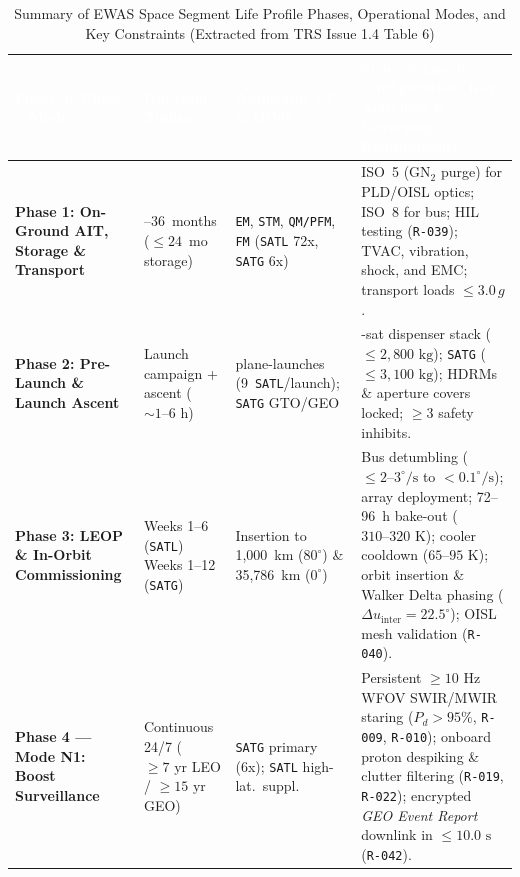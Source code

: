 \documentclass[11pt,a4paper]{article}
\newcommand{\thead}[1]{\textcolor{white}{\textbf{\textsf{#1}}}}
\providecommand{\abbr}[1]{#1}
\begin{document}
\begin{table}[H]
\centering
\caption{Summary of EWAS Space Segment Life Profile Phases, Operational Modes, and Key Constraints (Extracted from TRS Issue 1.4 Table 6)}
\label{tab:sseg_life_profile_archived}
{\scriptsize\setlength{\tabcolsep}{4pt}\renewcommand{\arraystretch}{1.04}%
%
%
\noindent
\begin{tabularx}{\textwidth}{|>{\raggedright\arraybackslash}p{2.5cm}|>{\raggedright\arraybackslash}p{2.0cm}|>{\raggedright\arraybackslash}p{2.7cm}|>{\raggedright\arraybackslash}X|}
    \hline
    \rowcolor{TableHeaderBlue}
    \thead{Lifecycle Phase / Mode} & \thead{Duration / Timing} & \thead{Applicable CI \& Orbit} & \thead{Space Segment Configuration, Key Activities \& Governing Requirements} \\ \hline
    \textbf{Phase 1: On-Ground \abbr{AIT}, Storage \& Transport} & 18--36~months ($\le 24$~mo storage) & \texttt{EM}, \texttt{STM}, \texttt{QM/PFM}, \texttt{FM} (\texttt{SATL} 72x, \texttt{SATG} 6x) & ISO~5 ($\mathrm{GN_2}$ purge) for \abbr{PLD}/\abbr{OISL} optics; ISO~8 for bus; \abbr{HIL} testing (\texttt{R-039}); \abbr{TVAC}, vibration, shock, and EMC; transport loads $\le 3.0\,g$. \\ \hline
    \textbf{Phase 2: Pre-Launch \& Launch Ascent} & Launch campaign + ascent ($\sim 1\text{--}6\text{ h}$) & 8 plane-launches (9~\texttt{SATL}/launch); \texttt{SATG} \abbr{GTO}/\abbr{GEO} & 9-sat dispenser stack ($\le 2{,}800\text{ kg}$); \texttt{SATG} ($\le 3{,}100\text{ kg}$); \abbr{HDRM}s \& aperture covers locked; $\ge 3$ safety inhibits. \\ \hline
    \textbf{Phase 3: \abbr{LEOP} \& In-Orbit Commissioning} & Weeks 1--6 (\texttt{SATL}) \newline Weeks 1--12 (\texttt{SATG}) & Insertion to 1,000~km ($80^\circ$) \& 35,786~km ($0^\circ$) & Bus detumbling ($\le 2\text{--}3^\circ/\text{s}$ to $< 0.1^\circ/\text{s}$); array deployment; 72--96~h bake-out ($310\text{--}320\text{ K}$); cooler cooldown ($65\text{--}95\text{ K}$); orbit insertion \& Walker Delta phasing ($\Delta u_{\text{inter}} = 22.5^\circ$); \abbr{OISL} mesh validation (\texttt{R-040}). \\ \hline
    \textbf{Phase 4 --- Mode N1: Boost Surveillance} & Continuous 24/7 ($\ge 7\text{ yr}$ \abbr{LEO} / $\ge 15\text{ yr}$ \abbr{GEO}) & \texttt{SATG} primary (6x); \texttt{SATL} high-lat.\ suppl. & Persistent $\ge 10\text{ Hz}$ \abbr{WFOV} \abbr{SWIR}/\abbr{MWIR} staring ($P_d > 95\%$, \texttt{R-009}, \texttt{R-010}); onboard proton despiking \& clutter filtering (\texttt{R-019}, \texttt{R-022}); encrypted \emph{GEO Event Report} downlink in $\le 10.0\text{ s}$ (\texttt{R-042}). \\ \hline

\end{tabularx}}
\end{table}
\end{document}
